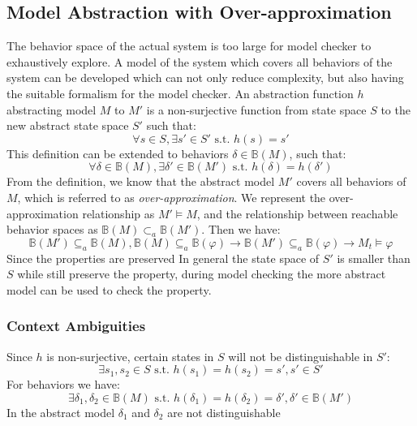 \subsection{Model Abstraction with Over-approximation}
The behavior space of the actual system is too large for model checker to exhaustively explore. A model of the system which covers all behaviors of the system can be developed which can not only reduce complexity, but also having the suitable formalism for the model checker. An abstraction function $h$ abstracting model $M$ to $M'$ is a non-surjective function from state space $S$ to the new abstract state space $S'$ such that: 
$$\forall s\in S, \exists s'\in S' \text{ s.t. } h(s)=s'$$
This definition can be extended to behaviors $\delta\in \mathbb{B}(M)$, such that:
$$\forall \delta\in \mathbb{B}(M),\exists \delta'\in\mathbb{B}(M')\text{ s.t. } h(\delta)=h(\delta')$$
From the definition, we know that the abstract model $M'$ covers all behaviors of $M$, which is referred to as \emph{over-approximation}. We represent the over-approximation relationship as $M'\models M$, and the relationship between reachable behavior spaces as $\mathbb{B}(M)\subset_a\mathbb{B}(M')$. Then we have:
$$\mathbb{B}(M')\subseteq_a \mathbb{B}(M),\mathbb{B}(M)\subseteq_a \mathbb{B}(\varphi)\rightarrow\mathbb{B}(M')\subseteq_a \mathbb{B}(\varphi)\rightarrow M_t\models\varphi$$
Since the properties are preserved In general the state space of $S'$ is smaller than $S$ while still preserve the property, during model checking the more abstract model can be used to check the property. 

\subsubsection{Context Ambiguities}

Since $h$ is non-surjective, certain states in $S$ will not be distinguishable in $S'$:
$$\exists s_1,s_2\in S \text{ s.t. }h(s_1)=h(s_2)=s',s'\in S'$$
For behaviors we have:
$$\exists \delta_1,\delta_2\in \mathbb{B}(M) \text{ s.t. }h(\delta_1)=h(\delta_2)=\delta',\delta'\in \mathbb{B}(M')$$
In the abstract model $\delta_1$ and $\delta_2$ are not distinguishable


